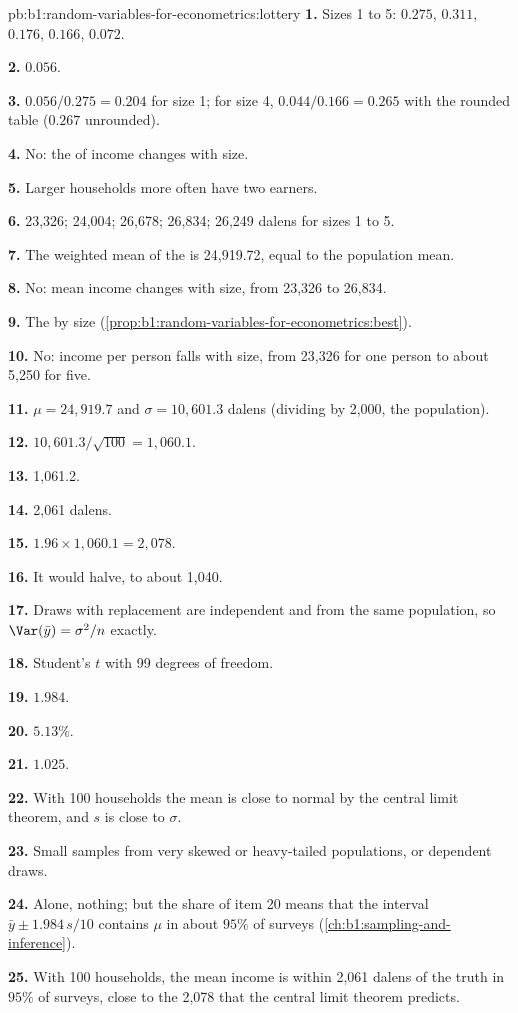 \begin{solution}{pb:b1:random-variables-for-econometrics:lottery}
\textbf{1.} Sizes 1 to 5: $0.275$, $0.311$, $0.176$, $0.166$, $0.072$.

\textbf{2.} $0.056$.

\textbf{3.} $0.056/0.275 = 0.204$ for size 1; for size 4, $0.044/0.166 = 0.265$ with the
rounded table ($0.267$ unrounded).

\textbf{4.} No: the  of income changes with size.

\textbf{5.} Larger households more often have two earners.

\textbf{6.} 23,326; 24,004; 26,678; 26,834; 26,249 dalens for sizes 1 to 5.

\textbf{7.} The weighted mean of the  is 24,919.72, equal to
the population mean.

\textbf{8.} No: mean income changes with size, from 23,326 to 26,834.

\textbf{9.} The  by size (\cref{prop:b1:random-variables-for-econometrics:best}).

\textbf{10.} No: income per person falls with size, from 23,326 for one person
to about 5,250 for five.

\textbf{11.} $\mu = 24{,}919.7$ and $\sigma = 10{,}601.3$ dalens (dividing by 2,000, the population).

\textbf{12.} $10{,}601.3/\sqrt{100} = 1{,}060.1$.

\textbf{13.} 1,061.2.

\textbf{14.} 2,061 dalens.

\textbf{15.} $1.96 \times 1{,}060.1 = 2{,}078$.

\textbf{16.} It would halve, to about 1,040.

\textbf{17.} Draws with replacement are independent and from the same
population, so $\Var(\bar y) = \sigma^2/n$ exactly.

\textbf{18.} Student's $t$ with 99 degrees of freedom.

\textbf{19.} $1.984$.

\textbf{20.} $5.13\%$.

\textbf{21.} $1.025$.

\textbf{22.} With 100 households the mean is close to normal by the central
limit theorem, and $s$ is close to $\sigma$.

\textbf{23.} Small samples from very skewed or heavy-tailed populations, or
dependent draws.

\textbf{24.} Alone, nothing; but the share of item 20 means that the interval
$\bar y \pm 1.984\,s/10$ contains $\mu$ in about $95\%$ of surveys (\cref{ch:b1:sampling-and-inference}).

\textbf{25.} With 100 households, the mean income is within 2,061 dalens of the
truth in $95\%$ of surveys, close to the 2,078 that the central limit theorem
predicts.
\end{solution}
